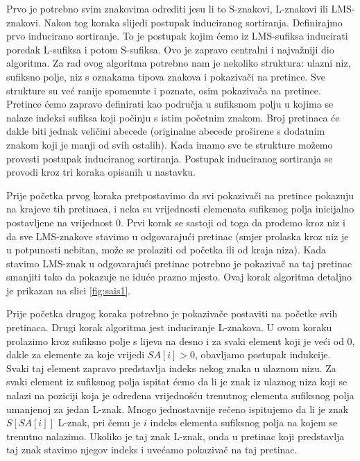 Prvo je potrebno svim znakovima odrediti jesu li to S-znakovi, L-znakovi ili LMS-znakovi. Nakon tog koraka slijedi postupak induciranog sortiranja. Definirajmo prvo inducirano sortiranje. To je postupak kojim ćemo iz LMS-sufiksa inducirati poredak L-sufiksa i potom S-sufiksa. Ovo je zapravo centralni i najvažniji dio algoritma. Za rad ovog algoritma potrebno nam je nekoliko struktura: ulazni niz, sufiksno polje, niz s oznakama tipova znakova i pokazivači na pretince. Sve strukture su već ranije spomenute i poznate, osim pokazivača na pretince. Pretince ćemo zapravo definirati kao područja u sufiksnom polju u kojima se nalaze indeksi sufiksa koji počinju s  istim početnim znakom. Broj pretinaca će dakle biti jednak veličini abecede (originalne abecede proširene s dodatnim znakom koji je manji od svih ostalih). Kada imamo sve te strukture možemo provesti postupak induciranog sortiranja. Postupak induciranog sortiranja se provodi kroz tri koraka opisanih u nastavku.

Prije početka prvog koraka pretpostavimo da svi pokazivači na pretince pokazuju na krajeve tih pretinaca, i neka su vrijednosti elemenata sufiksnog polja inicijalno postavljene na vrijednost 0. Prvi korak se sastoji od toga da prođemo kroz niz i da sve LMS-znakove stavimo u odgovarajući pretinac (smjer prolaska kroz niz je u potpunosti nebitan, može se prolaziti od početka ili od kraja niza). Kada stavimo LMS-znak u odgovarajući pretinac potrebno je pokazivač na taj pretinac smanjiti tako da pokazuje ne iduće prazno mjesto. Ovaj korak algoritma detaljno je prikazan na slici \ref{fig:sais1}.


Prije početka drugog koraka potrebno je pokazivače postaviti na početke svih pretinaca. Drugi korak algoritma jest induciranje L-znakova. U ovom koraku prolazimo kroz sufiksno polje s lijeva na desno i za svaki element koji je veći od 0, dakle za elemente za koje vrijedi $SA[i]>0$, obavljamo postupak indukcije. Svaki taj  element zapravo predstavlja indeks nekog znaka u ulaznom nizu. Za svaki element iz sufiksnog polja ispitat ćemo da li je znak iz ulaznog niza koji se nalazi na poziciji koja je određena vrijednošću trenutnog elementa sufiksnog polja umanjenoj za jedan L-znak. Mnogo jednostavnije rečeno  ispitujemo da li je znak $S[SA[i]]$ L-znak, pri čemu je $i$ indeks elementa sufiksnog polja na kojem se trenutno nalazimo. Ukoliko je taj znak L-znak, onda u pretinac koji predstavlja taj znak stavimo njegov indeks i uvećamo pokazivač na taj pretinac. 



